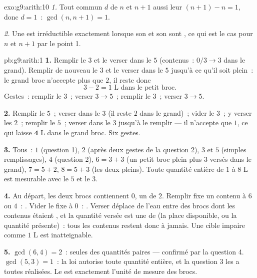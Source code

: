 \begin{solution}{exo:g9:arith:10}
\emph{1.} Tout  commun $d$ de $n$ et $n+1$  aussi leur
 $(n+1) - n = 1$, donc $d = 1$~: $\gcd(n, n+1) = 1$.

\emph{2.} Une  est irréductible exactement lorsque son
 et son  sont , ce qui est le
cas pour $n$ et $n + 1$ par le point 1.
\end{solution}

\begin{solution}{pb:g9:arith:1}
\textbf{1.} Remplir le $3$ et le verser dans le $5$ (contenus~:
$0/3 \to 3$ dans le grand). Remplir de nouveau le $3$ et le verser
dans le $5$ jusqu'à ce qu'il soit plein~: le grand broc n'accepte
plus que $2$, il reste donc
\[
3 - 2 = 1 \text{ L dans le petit broc.}
\]
Gestes~: remplir le $3$~; verser $3 \to 5$~; remplir le $3$~;
verser $3 \to 5$.

\textbf{2.} Remplir le $5$~; verser dans le $3$ (il reste $2$ dans
le grand)~; vider le $3$~; y verser les $2$~; remplir le $5$~;
verser dans le $3$ jusqu'à le remplir --- il n'accepte que $1$, ce
qui laisse $\mathbf{4}$ L dans le grand broc. Six gestes.

\textbf{3.} Tous~: $1$ (question 1), $2$ (après deux gestes de la
question 2), $3$ et $5$ (simples remplissages), $4$ (question 2),
$6 = 3 + 3$ (un petit broc plein plus $3$ versés dans le grand),
$7 = 5 + 2$, $8 = 5 + 3$ (les deux pleins). Toute quantité entière
de $1$ à $8$ L est mesurable avec le $5$ et le $3$.

\textbf{4.} Au départ, les deux brocs contiennent $0$, un 
de $2$. Remplir fixe un contenu à $6$ ou $4$~: . Vider le fixe à
$0$~: . Verser déplace de l'eau entre des brocs dont les
contenus étaient , et la quantité versée est une  de
 (la place disponible, ou la quantité présente)~: tous
les contenus restent donc  à jamais. Une cible impaire comme
$1$ L est inatteignable.

\textbf{5.} $\gcd(6, 4) = 2$~: seules des quantités paires ---
confirmé par la question 4. $\gcd(5, 3) = 1$~: la loi autorise toute
quantité entière, et la question 3 les a toutes réalisées. Le 
est exactement l'unité de mesure des brocs.


\end{solution}
